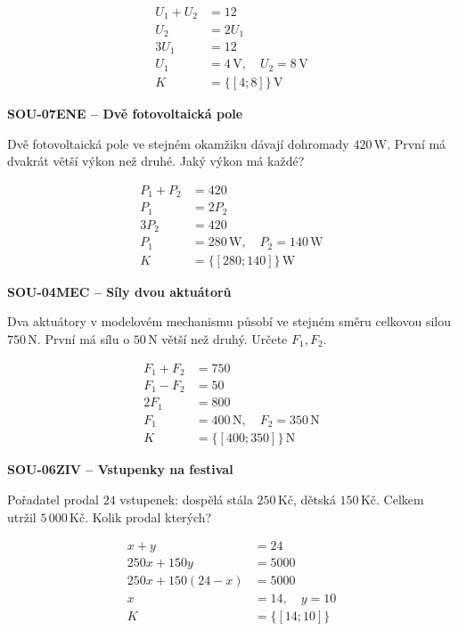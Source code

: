 \documentclass[11pt,a4paper]{article}
\begin{document}
\par\[\begin{aligned}
U_1+U_2&=12\\U_2&=2U_1\\3U_1&=12\\U_1&=4\,\mathrm V,\quad U_2=8\,\mathrm V\\K&=\{[4;8]\}\,\mathrm V
\end{aligned}\]
\par\medskip\noindent
\textbf{SOU-07}\quad\textbf{ENE -- Dvě fotovoltaická pole}\par
Dvě fotovoltaická pole ve stejném okamžiku dávají dohromady $420\,\mathrm W$. První má dvakrát větší výkon než druhé. Jaký výkon má každé?
\par\[\begin{aligned}
P_1+P_2&=420\\P_1&=2P_2\\3P_2&=420\\P_1&=280\,\mathrm W,\quad P_2=140\,\mathrm W\\K&=\{[280;140]\}\,\mathrm W
\end{aligned}\]
\par\medskip\noindent
\textbf{SOU-04}\quad\textbf{MEC -- Síly dvou aktuátorů}\par
Dva aktuátory v modelovém mechanismu působí ve stejném směru celkovou silou $750\,\mathrm N$. První má sílu o $50\,\mathrm N$ větší než druhý. Určete $F_1,F_2$.
\par\[\begin{aligned}
F_1+F_2&=750\\F_1-F_2&=50\\2F_1&=800\\F_1&=400\,\mathrm N,\quad F_2=350\,\mathrm N\\K&=\{[400;350]\}\,\mathrm N
\end{aligned}\]
\par\medskip\noindent
\textbf{SOU-06}\quad\textbf{ZIV -- Vstupenky na festival}\par
Pořadatel prodal $24$ vstupenek: dospělá stála $250\,\text{Kč}$, dětská $150\,\text{Kč}$. Celkem utržil $5\,000\,\text{Kč}$. Kolik prodal kterých?
\par\[\begin{aligned}
x+y&=24\\250x+150y&=5000\\250x+150(24-x)&=5000\\x&=14,\quad y=10\\K&=\{[14;10]\}
\end{aligned}\]
\end{document}
